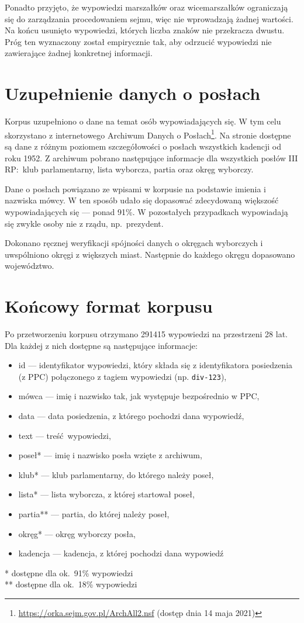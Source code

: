   Ponadto przyjęto, że wypowiedzi marszałków oraz wicemarszałków ograniczają się do zarządzania procedowaniem sejmu,
    więc nie wprowadzają żadnej wartości.
  Na końcu usunięto wypowiedzi, których liczba znaków nie przekracza dwustu.
  Próg ten wyznaczony został empirycznie tak, aby odrzucić wypowiedzi nie zawierające żadnej konkretnej informacji.

\section{Uzupełnienie danych o posłach}
  Korpus uzupełniono o dane na temat osób wypowiadających się.
  W tym celu skorzystano z internetowego Archiwum Danych o Posłach\footnote{\url{https://orka.sejm.gov.pl/ArchAll2.nsf} (dostęp dnia 14 maja 2021)}.
  Na stronie dostępne są dane z różnym poziomem szczegółowości o posłach wszystkich kadencji od roku 1952.
  Z archiwum pobrano następujące informacje dla wszystkich posłów III RP:\ klub parlamentarny, lista wyborcza, partia oraz okręg wyborczy.

  Dane o posłach powiązano ze wpisami w korpusie na podstawie imienia i nazwiska mówcy.
  W ten sposób udało się dopasować zdecydowaną większość wypowiadających się --- ponad 91\%.
  W pozostałych przypadkach wypowiadają się zwykle osoby nie z rządu, np.\ prezydent.

  Dokonano ręcznej weryfikacji spójności danych o okręgach wyborczych i uwspólniono okręgi z większych miast.
  Następnie do każdego okręgu dopasowano województwo.

\section{Końcowy format korpusu}
  Po przetworzeniu korpusu otrzymano 291415 wypowiedzi na przestrzeni 28 lat.
  Dla każdej z nich dostępne są następujące informacje:
  \begin{itemize}
    \item id --- identyfikator wypowiedzi, który składa się z identyfikatora posiedzenia (z PPC) połączonego z tagiem wypowiedzi (np. \verb|div-123|),
    \item mówca --- imię i nazwisko tak, jak występuje bezpośrednio w PPC,
    \item data --- data posiedzenia, z którego pochodzi dana wypowiedź,
    \item text --- treść wypowiedzi,
    \item poseł* --- imię i nazwisko posła wzięte z archiwum,
    \item klub* --- klub parlamentarny, do którego należy poseł,
    \item lista* --- lista wyborcza, z której startował poseł,
    \item partia** --- partia, do której należy poseł,
    \item okręg* --- okręg wyborczy posła,
    \item kadencja --- kadencja, z której pochodzi dana wypowiedź
  \end{itemize}
  \vspace{1em}
  * dostępne dla ok.~91\% wypowiedzi\\
  ** dostępne dla ok.~18\% wypowiedzi